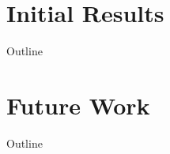 \documentclass{beamer}
\begin{document}

\section{Initial Results}
\begin{frame}[noframenumbering]{Outline}
\tableofcontents[currentsection]
\end{frame}


\section{Future Work}
\begin{frame}[noframenumbering]{Outline}
\tableofcontents[currentsection]
\end{frame}

\end{document}
